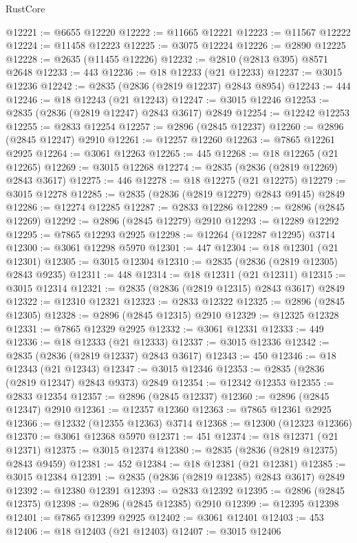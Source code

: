 \begin{lexlean}{RustCore}
\begin{coremodule}
@12221 := @6655 @12220
@12222 := @11665 @12221
@12223 := @11567 @12222
@12224 := @11458 @12223
@12225 := @3075 @12224
@12226 := @2890 @12225
@12228 := @2635 (@11455 @12226)
@12232 := @2810 (@2813 @395) @8571 @2648
@12233 := 443
@12236 := @18 @12233 (@21 @12233)
@12237 := @3015 @12236
@12242 := @2835 (@2836 (@2819 @12237) @2843 @8954)
@12243 := 444
@12246 := @18 @12243 (@21 @12243)
@12247 := @3015 @12246
@12253 := @2835 (@2836 (@2819 @12247) @2843 @3617) @2849
@12254 := @12242 @12253
@12255 := @2833 @12254
@12257 := @2896 (@2845 @12237)
@12260 := @2896 (@2845 @12247) @2910
@12261 := @12257 @12260
@12263 := @7865 @12261 @2925
@12264 := @3061 @12263
@12265 := 445
@12268 := @18 @12265 (@21 @12265)
@12269 := @3015 @12268
@12274 := @2835 (@2836 (@2819 @12269) @2843 @3617)
@12275 := 446
@12278 := @18 @12275 (@21 @12275)
@12279 := @3015 @12278
@12285 := @2835 (@2836 (@2819 @12279) @2843 @9145) @2849
@12286 := @12274 @12285
@12287 := @2833 @12286
@12289 := @2896 (@2845 @12269)
@12292 := @2896 (@2845 @12279) @2910
@12293 := @12289 @12292
@12295 := @7865 @12293 @2925
@12298 := @12264 (@12287 @12295) @3714
@12300 := @3061 @12298 @5970
@12301 := 447
@12304 := @18 @12301 (@21 @12301)
@12305 := @3015 @12304
@12310 := @2835 (@2836 (@2819 @12305) @2843 @9235)
@12311 := 448
@12314 := @18 @12311 (@21 @12311)
@12315 := @3015 @12314
@12321 := @2835 (@2836 (@2819 @12315) @2843 @3617) @2849
@12322 := @12310 @12321
@12323 := @2833 @12322
@12325 := @2896 (@2845 @12305)
@12328 := @2896 (@2845 @12315) @2910
@12329 := @12325 @12328
@12331 := @7865 @12329 @2925
@12332 := @3061 @12331
@12333 := 449
@12336 := @18 @12333 (@21 @12333)
@12337 := @3015 @12336
@12342 := @2835 (@2836 (@2819 @12337) @2843 @3617)
@12343 := 450
@12346 := @18 @12343 (@21 @12343)
@12347 := @3015 @12346
@12353 := @2835 (@2836 (@2819 @12347) @2843 @9373) @2849
@12354 := @12342 @12353
@12355 := @2833 @12354
@12357 := @2896 (@2845 @12337)
@12360 := @2896 (@2845 @12347) @2910
@12361 := @12357 @12360
@12363 := @7865 @12361 @2925
@12366 := @12332 (@12355 @12363) @3714
@12368 := @12300 (@12323 @12366)
@12370 := @3061 @12368 @5970
@12371 := 451
@12374 := @18 @12371 (@21 @12371)
@12375 := @3015 @12374
@12380 := @2835 (@2836 (@2819 @12375) @2843 @9459)
@12381 := 452
@12384 := @18 @12381 (@21 @12381)
@12385 := @3015 @12384
@12391 := @2835 (@2836 (@2819 @12385) @2843 @3617) @2849
@12392 := @12380 @12391
@12393 := @2833 @12392
@12395 := @2896 (@2845 @12375)
@12398 := @2896 (@2845 @12385) @2910
@12399 := @12395 @12398
@12401 := @7865 @12399 @2925
@12402 := @3061 @12401
@12403 := 453
@12406 := @18 @12403 (@21 @12403)
@12407 := @3015 @12406

\end{coremodule}
\end{lexlean}
